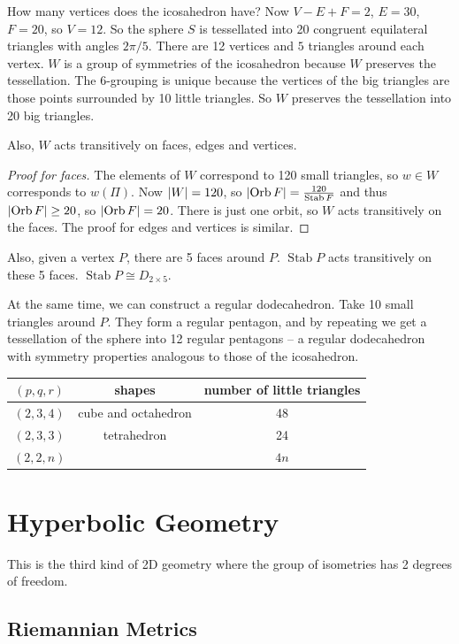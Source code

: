 \documentclass{notes}
\theoremstyle{plain}
\DeclareMathOperator{\Stab}{Stab}
\DeclareMathOperator{\Orb}{Orb}
\begin{document}
How many vertices does the icosahedron have?  Now $V-E+F=2$, $E=30$, $F=20$,
so $V=12$.  So the sphere $S$ is tessellated into 20 congruent equilateral
triangles with angles $2 \pi / 5$.  There are 12 vertices and $5$ triangles
around each vertex.   $W$ is a group of symmetries of the icosahedron because
$W$ preserves the tessellation.  The 6-grouping is unique because the vertices
of the big triangles are those points surrounded by 10 little triangles.  So 
$W$ preserves the tessellation into 20 big triangles.

Also, $W$ acts transitively on faces, edges and vertices.

\begin{proof}[Proof for faces]
The elements of $W$ correspond to 120 small triangles, so $w \in W$ corresponds
to $w(\Pi)$. Now $\left|W\right| = 120$, so $\abs{\Orb F} = \frac{120}{\Stab F}$ and
thus $\abs{\Orb F} \ge 20$, so $\abs{\Orb F} = 20$.  There is just one orbit,
so $W$ acts transitively on the faces.  The proof for edges and vertices is
similar.
\end{proof}

Also, given a vertex $P$, there are 5 faces around $P$.  $\Stab P$ acts
transitively on these 5 faces.  $\Stab P \cong D_{2 \times 5}$.

At the same time, we can construct a regular dodecahedron.  Take 10 small
triangles around $P$.  They form a regular pentagon, and by repeating we get
a tessellation of the sphere into 12 regular pentagons -- a regular dodecahedron
with symmetry properties analogous to those of the icosahedron.

\begin{center}
\begin{tabular}{c | c | c}
$(p,q,r)$ & shapes & number of little triangles \\
\hline
$(2,3,4)$ & cube and octahedron & 48 \\
$(2,3,3)$ & tetrahedron & 24 \\
$(2,2,n)$ &  & $4 n$
\end{tabular}
\end{center}

\chapter{Hyperbolic Geometry}

This is the third kind of 2D geometry where the group of isometries has 2
degrees of freedom.

\section{Riemannian Metrics}
\end{document}
